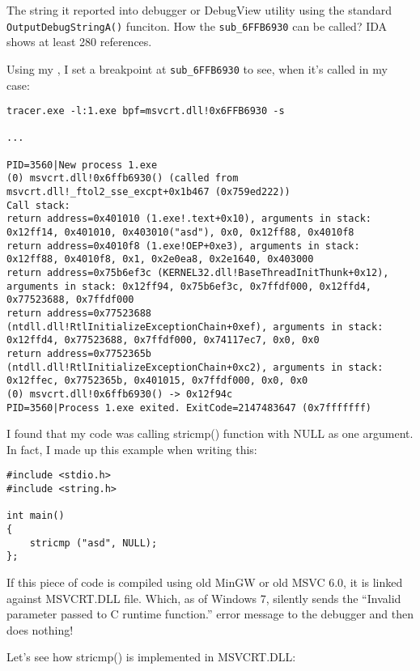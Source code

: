 The string it reported into debugger or DebugView utility using the standard \verb|OutputDebugStringA()| funciton.
How the \verb|sub_6FFB6930| can be called?
IDA shows at least 280 references.

Using my \tracer, I set a breakpoint at \verb|sub_6FFB6930| to see, when it's called in my case:

\begin{lstlisting}
tracer.exe -l:1.exe bpf=msvcrt.dll!0x6FFB6930 -s

...

PID=3560|New process 1.exe
(0) msvcrt.dll!0x6ffb6930() (called from msvcrt.dll!_ftol2_sse_excpt+0x1b467 (0x759ed222))
Call stack:
return address=0x401010 (1.exe!.text+0x10), arguments in stack: 0x12ff14, 0x401010, 0x403010("asd"), 0x0, 0x12ff88, 0x4010f8
return address=0x4010f8 (1.exe!OEP+0xe3), arguments in stack: 0x12ff88, 0x4010f8, 0x1, 0x2e0ea8, 0x2e1640, 0x403000
return address=0x75b6ef3c (KERNEL32.dll!BaseThreadInitThunk+0x12), arguments in stack: 0x12ff94, 0x75b6ef3c, 0x7ffdf000, 0x12ffd4, 0x77523688, 0x7ffdf000
return address=0x77523688 (ntdll.dll!RtlInitializeExceptionChain+0xef), arguments in stack: 0x12ffd4, 0x77523688, 0x7ffdf000, 0x74117ec7, 0x0, 0x0
return address=0x7752365b (ntdll.dll!RtlInitializeExceptionChain+0xc2), arguments in stack: 0x12ffec, 0x7752365b, 0x401015, 0x7ffdf000, 0x0, 0x0
(0) msvcrt.dll!0x6ffb6930() -> 0x12f94c
PID=3560|Process 1.exe exited. ExitCode=2147483647 (0x7fffffff)
\end{lstlisting}

I found that my code was calling stricmp() function with NULL as one argument.
In fact, I made up this example when writing this:

\begin{lstlisting}[style=customc]
#include <stdio.h>
#include <string.h>

int main()
{
	stricmp ("asd", NULL);
};
\end{lstlisting}

If this piece of code is compiled using old MinGW or old MSVC 6.0, it is linked against MSVCRT.DLL file.
Which, as of Windows 7, silently sends the ``Invalid parameter passed to C runtime function.''
error message to the debugger and then does nothing!

Let's see how stricmp() is implemented in MSVCRT.DLL:

